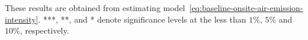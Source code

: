 \begin{table}[H]
{\begin{tabular}{@{}lllllllllllll@{}}
        \end{tabular}%
    }
    \begin{minipage}{18cm}
        \vspace{0.05in}
        These results are obtained from estimating model~\ref{eq:baseline-onsite-air-emission-intensity}. ***, **, and * denote significance levels at the less than $1\%$, $5\%$ and $10\%$, respectively.
    \end{minipage}
\end{table}